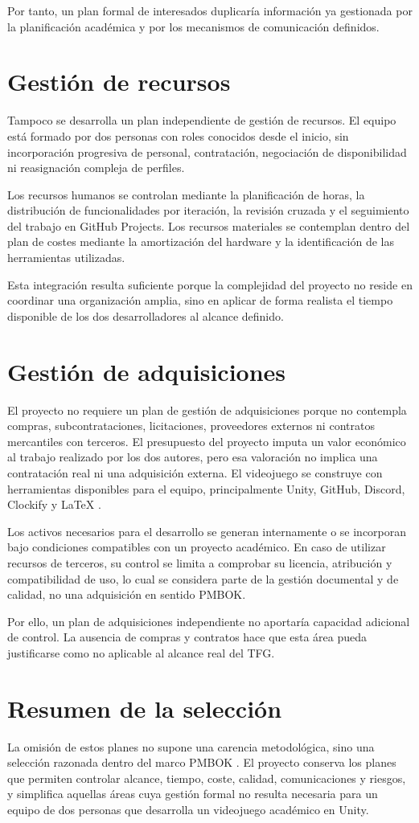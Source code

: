 Por tanto, un plan formal de interesados duplicaría información ya gestionada por la
planificación académica y por los mecanismos de comunicación definidos.

\section{Gestión de recursos}
Tampoco se desarrolla un plan independiente de gestión de recursos. El equipo está formado
por dos personas con roles conocidos desde el inicio, sin incorporación progresiva de
personal, contratación, negociación de disponibilidad ni reasignación compleja de perfiles.

Los recursos humanos se controlan mediante la planificación de horas, la distribución de
funcionalidades por iteración, la revisión cruzada y el seguimiento del trabajo en GitHub
Projects. Los recursos materiales se contemplan dentro del plan de costes mediante la
amortización del hardware y la identificación de las herramientas utilizadas.

Esta integración resulta suficiente porque la complejidad del proyecto no reside en
coordinar una organización amplia, sino en aplicar de forma realista el tiempo disponible de
los dos desarrolladores al alcance definido.

\section{Gestión de adquisiciones}
El proyecto no requiere un plan de gestión de adquisiciones porque no contempla compras,
subcontrataciones, licitaciones, proveedores externos ni contratos mercantiles con terceros.
El presupuesto del proyecto imputa un valor económico al trabajo realizado por los dos
autores, pero esa valoración no implica una contratación real ni una adquisición externa. El
videojuego se construye con herramientas disponibles para el equipo, principalmente Unity,
GitHub, Discord, Clockify y LaTeX
\cite{unityLearnGettingStarted,githubIssuesProjects,clockifyOfficial,latexProject}.

Los activos necesarios para el desarrollo se generan internamente o se incorporan bajo
condiciones compatibles con un proyecto académico. En caso de utilizar recursos de terceros,
su control se limita a comprobar su licencia, atribución y compatibilidad de uso, lo cual se
considera parte de la gestión documental y de calidad, no una adquisición en sentido PMBOK.

Por ello, un plan de adquisiciones independiente no aportaría capacidad adicional de
control. La ausencia de compras y contratos hace que esta área pueda justificarse como no
aplicable al alcance real del TFG.

\section{Resumen de la selección}
La omisión de estos planes no supone una carencia metodológica, sino una selección razonada
dentro del marco PMBOK \cite{pmbok2021}. El proyecto conserva los planes que permiten
controlar alcance, tiempo, coste, calidad, comunicaciones y riesgos, y simplifica aquellas
áreas cuya gestión formal no resulta necesaria para un equipo de dos personas que desarrolla
un videojuego académico en Unity.
